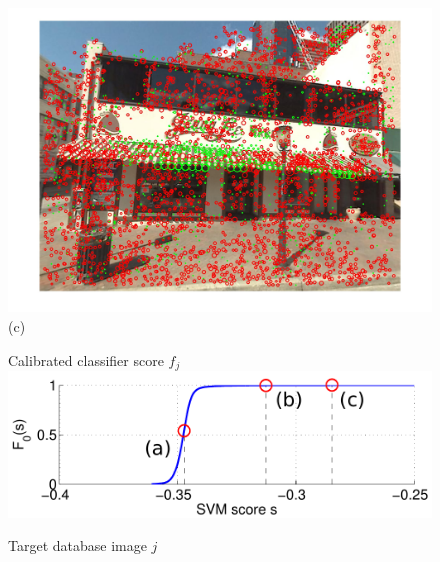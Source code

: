 \begin{figure}
\begin{minipage}{0.48\linewidth}
\begin{minipage}{\wii}
            \centering
            \includegraphics[width=\linewidth]{imgs/wVS3q/2882/cftrs.jpg}
            \newline
            (c)
          \end{minipage} 
    \end{minipage}%
    \begin{minipage}{0.04\linewidth}
      \hspace{\linewidth}
    \end{minipage}
    \begin{minipage}{0.48\linewidth}
          \begin{minipage}{0.66\linewidth}
            \centering
            {\scriptsize Calibrated classifier score $f_j$}
            \\
            \vspace{2mm}
            \includegraphics[width=\linewidth]{imgs/wVS3q/2932/graphBigO.pdf}
          \end{minipage} 
          \begin{minipage}{\wii}
            \centering
            \centerline{\scriptsize Target database image $j$}

\end{minipage}
\end{minipage}
\end{figure}
